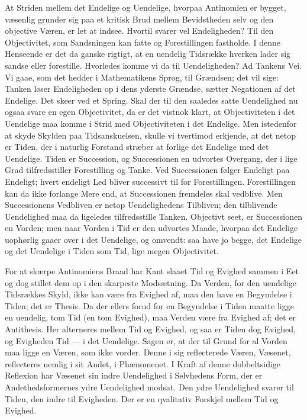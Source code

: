 \documentclass[12pt,a4paper]{book}
\begin{document}
At Striden mellem det Endelige og Uendelige, hvorpaa Antinomien er
bygget, væsenlig grunder sig paa et kritisk Brud mellem Bevidstheden
selv og den objective Væren, er let at indsee. Hvortil svarer vel
Endeligheden? Til den Objectivitet, som Sandsningen kan fatte og
Forestillingen fastholde. I denne Henseende er det da ganske rigtigt,
at en uendelig Tidsrække hverken lader sig sandse eller forestille.
Hvorledes komme vi da til Uendeligheden? Ad Tankens Vei. Vi gaae, som
det hedder i Mathematikens Sprog, til Grændsen; det vil sige: Tanken
løser Endeligheden op i dens yderste Grændse, sætter Negationen af det
Endelige. Det skeer ved et Spring. Skal der til den saaledes satte
Uendelighed nu ogsaa svare en egen Objectivitet, da er det vistnok
klart, at Objectiviteten i det Uendelige maa komme i Strid med
Objectiviteten i det Endelige. Men istedenfor at skyde Skylden paa
Tidsanskuelsen, skulle vi tvertimod erkjende, at det netop er Tiden,
der i naturlig Forstand stræber at forlige det Endelige med det
Uendelige. Tiden er Succession, og Successionen en udvortes Overgang,
der i lige Grad tilfredsstiller Forestilling og Tanke. Ved
Successionen følger Endeligt paa Endeligt; hvert endeligt Led bliver
successivt til for Forestillingen. Forestillingen kan da ikke forlange
Mere end, at Successionen fremdeles skal vedblive. Men Successionens
Vedbliven er netop Uendelighedens Tilbliven; den tilblivende
Uendelighed maa da ligeledes tilfredsstille Tanken. Objectivt seet, er
Successionen en Vorden; men naar Vorden i Tid er den udvortes Maade,
hvorpaa det Endelige uophørlig gaaer over i det Uendelige,
og omvendt: saa have jo begge, det Endelige og det Uendelige i Tiden
som Tid, lige megen Objectivitet.

For at skærpe Antinomiens Braad har Kant slaaet Tid og Evighed sammen
i Eet og dog stillet dem op i den skarpeste Modsætning. Da Verden, for
den uendelige Tidsrækkes Skyld, ikke kan være fra Evighed af, maa den
have en Begyndelse i Tiden; det er Thesis. Da der ellers forud for en
Begyndelse i Tiden maatte ligge en uendelig, tom Tid (en tom Evighed),
maa Verden være fra Evighed af; det er Antithesis. Her alterneres
mellem Tid og Evighed, og saa er Tiden dog Evighed, og Evigheden Tid
--- i det Uendelige. Sagen er, at der til Grund for al Vorden maa
ligge en Væren, som ikke vorder. Denne i sig reflecterede Væren,
Væsenet, reflecteres nemlig i sit Andet, i Phænomenet. I Kraft af denne
dobbeltsidige Reflexion har Væsenet sin indre Uendelighed i Selvhedens
Form, der er Andethedsformernes ydre Uendelighed modsat. Den ydre
Uendelighed svarer til Tiden, den indre til Evigheden. Der er en
qvalitativ Forskjel mellem Tid og Evighed.
\end{document}
